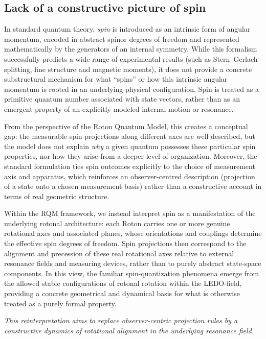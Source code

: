 \documentclass[11pt,a4paper]{article}
\begin{document}
\subsection{Lack of a constructive picture of spin}

In standard quantum theory, \emph{spin} is introduced as an intrinsic form of angular momentum, encoded in abstract spinor degrees of freedom and represented mathematically by the generators of an internal symmetry. While this formalism successfully predicts a wide range of experimental results (such as Stern--Gerlach splitting, fine structure and magnetic moments), it does not provide a concrete substructural mechanism for what ``spins'' or how this intrinsic angular momentum is rooted in an underlying physical configuration. Spin is treated as a primitive quantum number associated with state vectors, rather than as an emergent property of an explicitly modeled internal motion or resonance.

From the perspective of the Roton Quantum Model, this creates a conceptual gap: the measurable spin projections along different axes are well described, but the model does not explain \emph{why} a given quantum possesses these particular spin properties, nor how they arise from a deeper level of organization. Moreover, the standard formulation ties spin outcomes explicitly to the choice of measurement axis and apparatus, which reinforces an observer-centred description (projection of a state onto a chosen measurement basis) rather than a constructive account in terms of real geometric structure.

Within the RQM framework, we instead interpret spin as a manifestation of the underlying rotonal architecture: each Roton carries one or more genuine rotational axes and associated planes, whose orientations and couplings determine the effective spin degrees of freedom. Spin projections then correspond to the alignment and precession of these real rotational axes relative to external resonance fields and measuring devices, rather than to purely abstract state-space components. In this view, the familiar spin-quantization phenomena emerge from the allowed stable configurations of rotonal rotation within the LEDO-field, providing a concrete geometrical and dynamical basis for what is otherwise treated as a purely formal property.

\emph{This reinterpretation aims to replace observer-centric projection rules by a constructive dynamics of rotational alignment in the underlying resonance field.}
\end{document}
